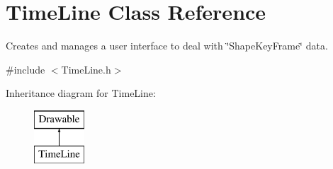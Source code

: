 \hypertarget{class_time_line}{}\section{Time\+Line Class Reference}
\label{class_time_line}


Creates and manages a user interface to deal with \char`\"{}\+Shape\+Key\+Frame\char`\"{} data.  




{\ttfamily \#include $<$Time\+Line.\+h$>$}

Inheritance diagram for Time\+Line\+:\begin{figure}[H]
\begin{center}
\leavevmode
\includegraphics[height=2.000000cm]{class_time_line}
\end{center}
\end{figure}
